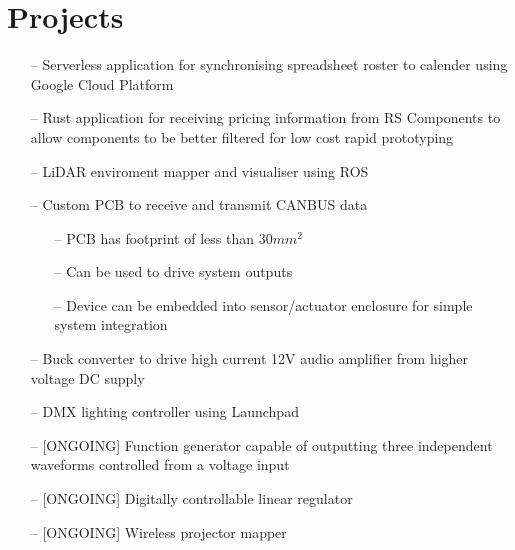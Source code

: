 \section{Projects}

\begin{itemize}[leftmargin=10pt, itemsep=0pt]
    \item[--] Serverless application for synchronising spreadsheet roster to calender
                using Google Cloud Platform

    \item[--] Rust application for receiving pricing information from RS Components
                to allow components to be better filtered for low cost rapid prototyping

    \item[--] LiDAR enviroment mapper and visualiser using ROS

    \item[--] Custom PCB to receive and transmit CANBUS data
      \begin{itemize}
        \item[--] PCB has footprint of less than \(30 mm^{2}\)
        \item[--] Can be used to drive system outputs
        \item[--] Device can be embedded into sensor/actuator enclosure for simple system integration
      \end{itemize}

    \item[--] Buck converter to drive high current 12V audio amplifier from higher voltage DC supply

    \item[--] DMX lighting controller using Launchpad

    \item[--] [ONGOING] Function generator capable of outputting three independent waveforms controlled from a voltage input

    \item[--] [ONGOING] Digitally controllable linear regulator

    \item[--] [ONGOING] Wireless projector mapper
\end{itemize}
